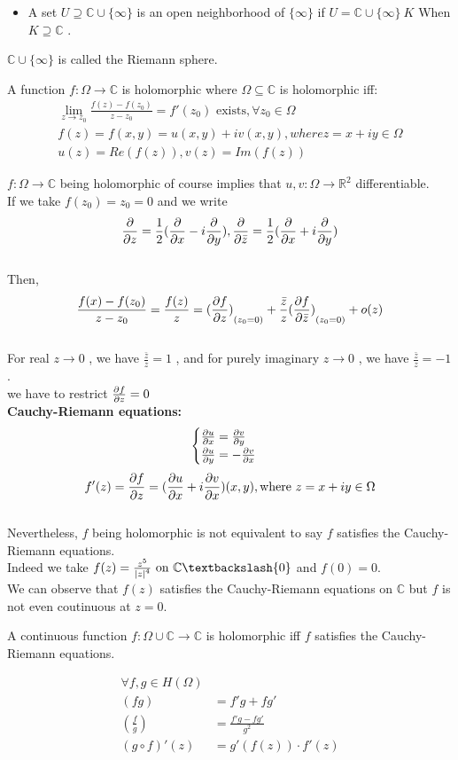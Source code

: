 \begin{definition}{}
\begin{itemize}
\item A set $ U\supseteq \mathbb{C}\cup\{\infty\} $ is an open neighborhood of $\{ \infty \}$ if $ U=\mathbb{C}\cup \{\infty\}\ K $ When $ K \supseteq \mathbb{C} $ .
\end{itemize}
\end{definition}
$\mathbb{C}\cup\{\infty\}$ is called the Riemann sphere.
\begin{definition}{}
A function $ f:\Omega\rightarrow \mathbb{C} $ is holomorphic where $ \Omega \subseteq \mathbb{C} $ is holomorphic iff:
\begin{align*}{}{}
\lim_{z\rightarrow z_0}\frac{f(z)-f(z_0)}{z-z_0}=f'(z_0) \text{ exists}, \forall z_0 \in \Omega
\\f(z)=f(x,y)=u(x,y)+iv(x,y),where z=x+iy \in \Omega
\\u(z)=Re(f(z)),v(z)=Im(f(z))
\end{align*}
\end{definition}
$ f:\Omega \rightarrow \mathbb{C} $ being holomorphic of course implies that $ u,v:\Omega \rightarrow \mathbb{R}^2 $ differentiable.
\\If we take $ f(z_0)=z_0=0 $ and we write 
$$
    \pdv{}{z}=\frac{1}{2}(\pdv{}{x}-i\pdv{}{y}), \pdv{}{\bar{z}}=\frac{1}{2}(\pdv{}{x}+i\pdv{}{y})
$$ 
\\Then,
$$
    \frac{f(x)-f(z_0)}{z-z_0}=\frac{f(z)}{z}={(\pdv{f}{z})}_{(z_0=0)}+\frac{\bar{z}}{z}{(\pdv{f}{\bar{z}})}_{(z_0=0)}+o(z)
$$ 
\\For real $ z\rightarrow 0 $ , we have $ \frac{\bar{z}}{z}=1 $  , and for purely imaginary $ z\rightarrow 0 $ , we have $ \frac{\bar{z}}{z}=-1 $.
\\we have to restrict $\pdv{f}{z}=0$
\\\textbf{Cauchy-Riemann equations:}
$$\begin{cases}
    \pdv{u}{x}=\pdv{v}{y}
    \\\pdv{u}{y}=-\pdv{v}{x}
\end{cases}$$
$$
    f'(z)=\pdv{f}{z}=(\pdv{u}{x}+i\pdv{v}{x})(x,y), \text{where } z=x+iy \in \Omega
$$ 
\\Nevertheless, $ f $ being holomorphic is not equivalent to say $ f $ satisfies the Cauchy-Riemann equations.
\\Indeed we take $ f(z)=\frac{z^5}{{|z|}^4} \text{  on  } \mathbb{C}\textbackslash \{0\}   $  and $ f(0)=0 $.
\\We can observe that $ f(z) $ satisfies the Cauchy-Riemann equations on $ \mathbb{C} $ but $ f $ is not even coutinuous at $ z=0 $.
\begin{theorem}{}
A continuous function $ f:\Omega \cup \mathbb{C} \rightarrow \mathbb{C} $ is holomorphic iff $ f $ satisfies the Cauchy-Riemann equations.
\end{theorem}
\begin{align*}{}{}
\forall f,g \in H(\Omega)
\\(fg)&=f'g+fg'
\\(\frac{f}{g})&=\frac{f'g-fg'}{g^2}
\\(g\circ f)'(z)&=g'(f(z))\cdot f'(z)
\end{align*}
